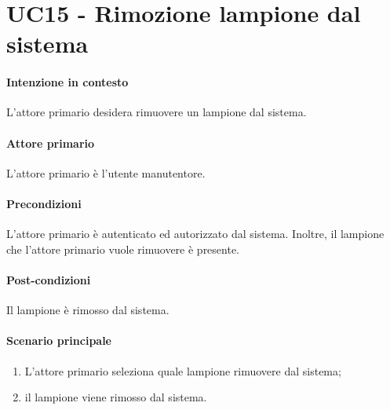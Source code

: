 \section{UC15 - Rimozione lampione dal sistema}\label{uc:15}


\paragraph{Intenzione in contesto}
L'attore primario desidera rimuovere un lampione dal sistema.
\paragraph{Attore primario}L'attore primario è l'utente manutentore.

\paragraph{Precondizioni} L'attore primario è autenticato ed autorizzato dal sistema. Inoltre, il lampione che l'attore primario vuole rimuovere è presente.

\paragraph{Post-condizioni} Il lampione è rimosso dal sistema.
\paragraph{Scenario principale}
\begin{enumerate}
    \item L'attore primario seleziona quale lampione rimuovere dal sistema;
    \item il lampione viene rimosso dal sistema.
\end{enumerate}